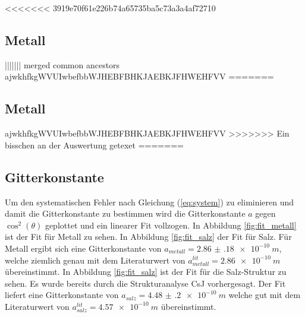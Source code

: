 <<<<<<< 3919e70f61e226b74a65735ba5c73a3a4af72710
\subsection{Metall}
||||||| merged common ancestors
ajwkhfkgWVUIwbefbbWJHEBFBHKJAEBKJFHWEHFVV
=======

\subsection{Metall}

ajwkhfkgWVUIwbefbbWJHEBFBHKJAEBKJFHWEHFVV
>>>>>>> Ein bisschen an der Auswertung getexet
=======
\subsection{Gitterkonstante}

Um den systematischen Fehler nach Gleichung (\ref{eq:system}) zu eliminieren und damit die Gitterkonstante zu bestimmen wird die Gitterkonstante $a$ gegen $\cos^2(\theta)$ geplottet und ein linearer Fit vollzogen. In Abbildung \ref{fig:fit_metall} ist der Fit für Metall zu sehen. In Abbildung \ref{fig:fit_salz} der Fit für Salz. Für Metall ergibt sich eine Gitterkonstante von $a_{metall} = \SI{2.86(18)e-10}{m}$, welche ziemlich genau mit dem Literaturwert von $a_{metall}^{lit} = \SI{2.86e-10}{m}$ \cite{metall} übereinstimmt. In Abbildung \ref{fig:fit_salz} ist der Fit für die Salz-Struktur zu sehen. Es wurde bereits durch die Strukturanalyse CsJ vorhergesagt. Der Fit liefert eine Gitterkonstante von $a_{salz} = \SI{4.48(20)e-10}{m}$ welche gut mit dem Literaturwert von $a_{salz}^{lit} = \SI{4.57e-10}{m}$ \cite{Gross} übereinstimmt.

